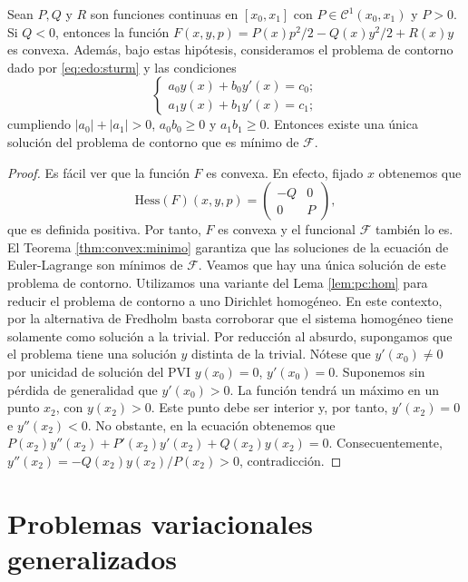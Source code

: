 \documentclass{article}
\begin{document}
\begin{thm} \label{thm:sturm:pv} Sean $P, Q$ y $R$ son funciones continuas en $[x_0, x_1]$ con
  $P \in \mathcal{C}^1(x_0, x_1)$ y $P > 0$. Si $Q < 0$, entonces la función
  $F(x,y,p) = P(x) p^2/2 - Q(x) y^2/2 + R(x)y$ es convexa. Además, bajo estas hipótesis, consideramos el problema
  de contorno dado por \eqref{eq:edo:sturm} y las condiciones
  \begin{equation}
    \begin{cases}
      a_0 y(x) + b_0 y'(x) = c_0; \\
      a_1 y(x) + b_1 y'(x) = c_1;
    \end{cases}
  \end{equation}
  cumpliendo $|a_0| + |a_1| > 0$, $a_0 b_0 \ge 0$ y $a_1b_1 \ge 0$. Entonces existe una única
  solución del problema de contorno que es mínimo de $\mathcal{F}$.
\end{thm}
\begin{proof}
  Es fácil ver que la función $F$ es convexa. En efecto, fijado $x$ obtenemos que
  \[ \mathrm{Hess}(F)(x,y,p) = \left(
      \begin{matrix}
        -Q & 0 \\
        0 & P
      \end{matrix}
    \right), \] que es definida positiva. Por tanto, $F$ es convexa y el funcional $\mathcal{F}$
  también lo es. El Teorema \ref{thm:convex:minimo} garantiza que las soluciones de la ecuación de
  Euler-Lagrange son mínimos de $\mathcal{F}$. Veamos que hay una única solución de este problema de
  contorno. Utilizamos una variante del Lema \ref{lem:pc:hom} para reducir el problema de contorno
  a uno Dirichlet homogéneo. En este contexto, por la alternativa de Fredholm basta corroborar que
  el sistema homogéneo tiene solamente como solución a la trivial. Por reducción al absurdo,
  supongamos que el problema tiene una solución $y$ distinta de la trivial. Nótese que
  $y'(x_0) \ne 0$ por unicidad de solución del PVI $y(x_0) = 0$, $y'(x_0) = 0$. Suponemos sin
  pérdida de generalidad que $y'(x_0) > 0$. La función tendrá un máximo en un punto $x_2$, con
  $y(x_2) > 0$. Este punto debe ser interior y, por tanto, $y'(x_2) = 0$ e $y''(x_2) < 0$. No
  obstante, en la ecuación obtenemos que $P(x_2)y''(x_2) + P'(x_2)y'(x_2) + Q(x_2) y(x_2) =
  0$. Consecuentemente, $y''(x_2) = - Q(x_2) y(x_2) / P(x_2) > 0$, contradicción.
\end{proof}

\section{Problemas variacionales generalizados}
\end{document}
